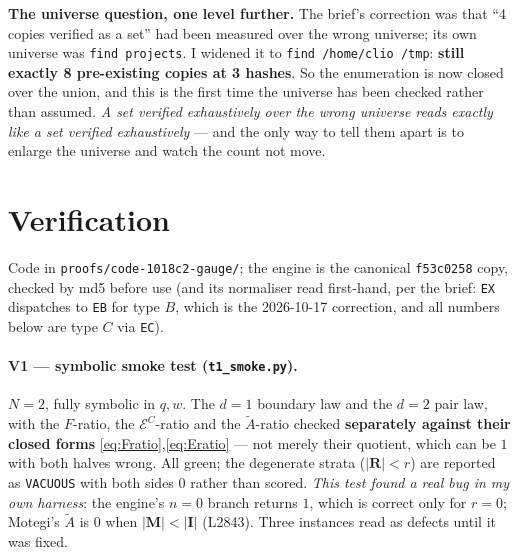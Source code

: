 \documentclass[11pt]{article}
\theoremstyle{definition}
\newcommand{\At}{\widetilde{A}}
\newcommand{\bM}{\mathbf{M}}
\newcommand{\bI}{\mathbf{I}}
\newcommand{\bR}{\mathbf{R}}
\begin{document}
\textbf{The universe question, one level further.}  The brief's correction was
that ``4 copies verified as a set'' had been measured over the wrong universe;
its own universe was \texttt{find projects}.  I widened it to
\texttt{find /home/clio /tmp}: \textbf{still exactly 8 pre-existing copies at 3
hashes}.  So the enumeration is now closed over the union, and this is the first
time the universe has been checked rather than assumed.  \emph{A set verified
exhaustively over the wrong universe reads exactly like a set verified
exhaustively} --- and the only way to tell them apart is to enlarge the universe
and watch the count not move.

\section{Verification}
\label{sec:verif}

Code in \texttt{proofs/code-1018c2-gauge/}; the engine is the canonical
\texttt{f53c0258} copy, checked by md5 before use (and its normaliser read
first-hand, per the brief: \texttt{EX} dispatches to \texttt{EB} for type $B$,
which is the 2026-10-17 correction, and all numbers below are type $C$ via
\texttt{EC}).

\paragraph{V1 --- symbolic smoke test (\texttt{t1\_smoke.py}).}
$N=2$, fully symbolic in $q,w$.  The $d=1$ boundary law and the $d=2$ pair law,
with the $F$-ratio, the $\mathcal{E}^{C}$-ratio and the $\At$-ratio checked
\textbf{separately against their closed forms}
\eqref{eq:Fratio},\eqref{eq:Eratio} --- not merely their quotient, which can be
$1$ with both halves wrong.  All green; the degenerate strata ($|\bR|<r$) are
reported as \texttt{VACUOUS} with both sides $0$ rather than scored.
\emph{This test found a real bug in my own harness}: the engine's $n=0$ branch
returns $1$, which is correct only for $r=0$; Motegi's $\At$ is $0$ when
$|\bM|<|\bI|$ (L2843).  Three instances read as defects until it was fixed.
\end{document}
